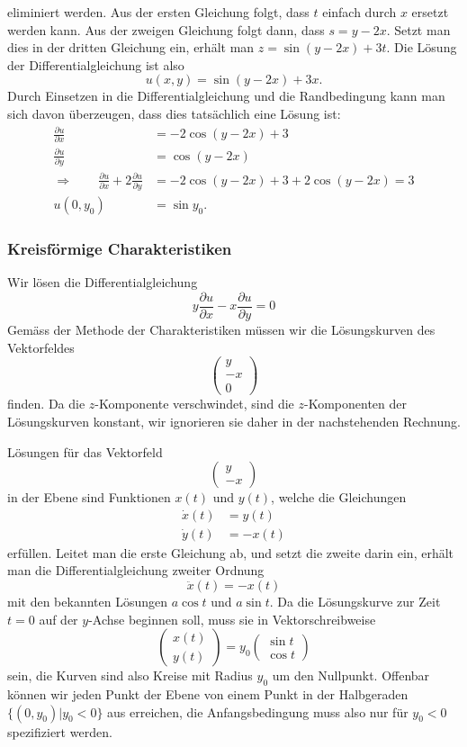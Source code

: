 eliminiert werden.
Aus der ersten Gleichung folgt, dass $t$ einfach durch $x$ ersetzt werden
kann.
Aus der zweigen Gleichung folgt dann, dass $s=y-2x$.
Setzt man dies in der dritten Gleichung ein, erhält man $z=\sin(y-2x)+3t$.
Die Lösung der Differentialgleichung ist also
\[
u(x,y)=\sin(y-2x)+3x.
\]
Durch Einsetzen in die Differentialgleichung und die Randbedingung
kann man sich davon überzeugen, dass dies tatsächlich eine Lösung
ist:
\begin{align*}
\frac{\partial u}{\partial x}
&=-2\cos(y-2x)+3
\\
\frac{\partial u}{\partial y}
&=\cos (y-2x)
\\
\Rightarrow\qquad
\frac{\partial u}{\partial x}
+2
\frac{\partial u}{\partial y}
&=
-2\cos(y-2x)+3
+2\cos(y-2x)=3
\\
u(0,y_0)&=\sin y_0.
\end{align*}

\subsubsection{Kreisförmige Charakteristiken}
Wir lösen die Differentialgleichung
\[
y\frac{\partial u}{\partial x}-x\frac{\partial u}{\partial y}=0
\]
Gemäss der Methode der Charakteristiken müssen wir die Lösungskurven
des Vektorfeldes
\[
\begin{pmatrix}
y\\-x\\0
\end{pmatrix}
\]
finden. Da die $z$-Komponente verschwindet, sind die $z$-Komponenten
der Lösungskurven konstant, wir ignorieren sie daher in der nachstehenden
Rechnung.

Lösungen für das Vektorfeld 
\[
\begin{pmatrix}
y\\-x
\end{pmatrix}
\]
in der Ebene sind Funktionen $x(t)$ und $y(t)$, welche die Gleichungen
\begin{align*}
\dot x(t)&=y(t)\\
\dot y(t)&=-x(t)
\end{align*}
erfüllen. Leitet man die erste Gleichung ab, und setzt die zweite
darin ein, erhält man die Differentialgleichung zweiter Ordnung
\[
\ddot x(t)=-x(t)
\]
mit den bekannten Lösungen $a\cos t$ und $a \sin t$. Da die Lösungskurve
zur Zeit $t=0$ auf der $y$-Achse beginnen soll, muss sie in Vektorschreibweise
\[
\begin{pmatrix}
x(t)\\y(t)
\end{pmatrix}
=y_0\begin{pmatrix}
\sin t\\
\cos t
\end{pmatrix}
\]
sein, die Kurven sind also Kreise mit Radius $y_0$ um den Nullpunkt. Offenbar
können wir jeden Punkt der Ebene von einem Punkt in der Halbgeraden
$\{(0,y_0)|y_0 <0\}$ aus erreichen, die Anfangsbedingung muss also nur für
$y_0<0$ spezifiziert werden.


